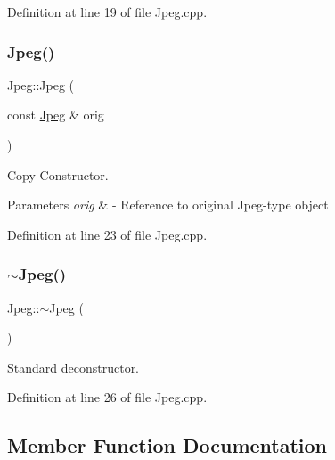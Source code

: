 Definition at line 19 of file Jpeg.\+cpp.

\mbox{\label{classJpeg_abc02dc366057e25e538b8c76c5463554}} 
\subsubsection{\texorpdfstring{Jpeg()}{Jpeg()}\hspace{0.1cm}{\footnotesize\ttfamily [3/3]}}
{\footnotesize\ttfamily Jpeg\+::\+Jpeg (\begin{DoxyParamCaption}\item[{const \mbox{\hyperlink{classJpeg}{Jpeg}} \&}]{orig }\end{DoxyParamCaption})}



Copy Constructor. 


\begin{DoxyParams}{Parameters}
{\em orig} & -\/ Reference to original Jpeg-\/type object \\
\hline
\end{DoxyParams}


Definition at line 23 of file Jpeg.\+cpp.

\mbox{\label{classJpeg_aa03b879cc5185f52c4c9e39faf03db85}} 
\subsubsection{\texorpdfstring{$\sim$Jpeg()}{~Jpeg()}}
{\footnotesize\ttfamily Jpeg\+::$\sim$\+Jpeg (\begin{DoxyParamCaption}{ }\end{DoxyParamCaption})\hspace{0.3cm}{\ttfamily [virtual]}}

Standard deconstructor. 

Definition at line 26 of file Jpeg.\+cpp.



\subsection{Member Function Documentation}
\mbox{\label{classJpeg_a80db9e22efc544e32145b6743b2b407c}} 
